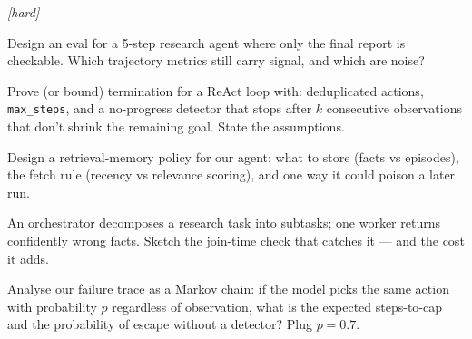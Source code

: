 \emph{[hard]}
\begin{exercise}
Design an eval for a 5-step research agent where only the final
report is checkable. Which trajectory metrics still carry signal,
and which are noise?
\end{exercise}
\begin{exercise}
Prove (or bound) termination for a ReAct loop with: deduplicated
actions, \texttt{max\_steps}, and a no-progress detector that stops
after $k$ consecutive observations that don't shrink the remaining
goal. State the assumptions.
\end{exercise}
\begin{exercise}
Design a retrieval-memory policy for our agent: what to store
(facts vs episodes), the fetch rule (recency vs relevance scoring),
and one way it could poison a later run.
\end{exercise}
\begin{exercise}
An orchestrator decomposes a research task into subtasks; one
worker returns confidently wrong facts. Sketch the join-time
check that catches it --- and the cost it adds.
\end{exercise}
\begin{exercise}
Analyse our failure trace as a Markov chain: if the model picks the
same action with probability $p$ regardless of observation, what is
the expected steps-to-cap and the probability of escape without a
detector? Plug $p=0.7$.
\end{exercise}

